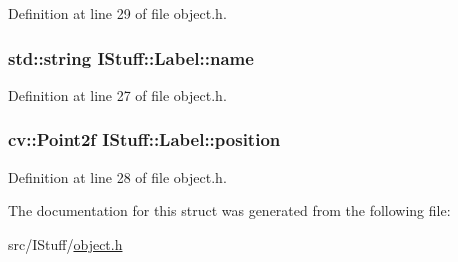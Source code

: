 Definition at line 29 of file object.\-h.

\hypertarget{struct_i_stuff_1_1_label_a11026b588c7a66f59bf233529c9aa6ed}{
\subsubsection[{name}]{\setlength{\rightskip}{0pt plus 5cm}std\-::string I\-Stuff\-::\-Label\-::name}}\label{struct_i_stuff_1_1_label_a11026b588c7a66f59bf233529c9aa6ed}


Definition at line 27 of file object.\-h.

\hypertarget{struct_i_stuff_1_1_label_a06b344b0151f8c836e89d885a2e96975}{
\subsubsection[{position}]{\setlength{\rightskip}{0pt plus 5cm}cv\-::\-Point2f I\-Stuff\-::\-Label\-::position}}\label{struct_i_stuff_1_1_label_a06b344b0151f8c836e89d885a2e96975}


Definition at line 28 of file object.\-h.



The documentation for this struct was generated from the following file\-:\begin{DoxyCompactItemize}
\item 
src/\-I\-Stuff/\hyperlink{object_8h}{object.\-h}\end{DoxyCompactItemize}
